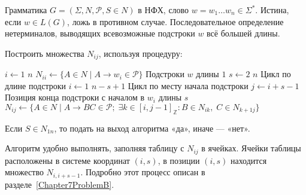 {\label{cyk}Грамматика $G=(\Sigma, N, \mathcal P, S \in N)$ в НФХ,
слово $w = w_1 \ldots w_n \in \Sigma^*$.}
{Истина, если $w \in L(G)$, ложь  в противном случае.}
{Последовательное определение нетерминалов, выводящих
всевозможные подстроки $w$ всё большей длины.}
{
\item Построить множества $N_{ij}$, используя процедуру:
\begin{codebox}
\zi\For $i \gets 1$  $n$
\zi     \Do
        $N_{ii} \gets \{ A \in N \mid A \to w_i \in \mathcal P  \}$
        \Comment Подстроки $w$ длины $1$
        \End
\zi\For $s \gets 2$  $n$ \Comment Цикл по длине подстроки
\zi     \Do
        \For $i \gets 1$  $n - s + 1$ \Comment Цикл по месту начала подстроки
\zi         $j \gets i + s - 1$
            \Comment Позиция конца подстроки с началом в $w_i$ длины $s$
\zi         $N_{ij} \gets \{ A \in N \mid A \to BC \in \mathcal P; \;
                \exists k \in [i, j-1]_{\mathbb Z} \colon B \in N_{ik}, \;
                C \in N_{k+1 j} \} $
        \End
\end{codebox}

\item
Если $S \in N_{1n}$, то подать на выход алгоритма «да», иначе — «нет».
}

\begin{myremark}
Алгоритм удобно выполнять, заполняя таблицу с $N_{ij}$ в ячейках. Ячейки таблицы
расположены в системе координат $(i,s)$, в позиции $(i,s)$ находится множество
$N_{i, i+s-1}$. Подробно этот процесс описан в разделе~\ref{Chapter7ProblemB}.
\end{myremark}
